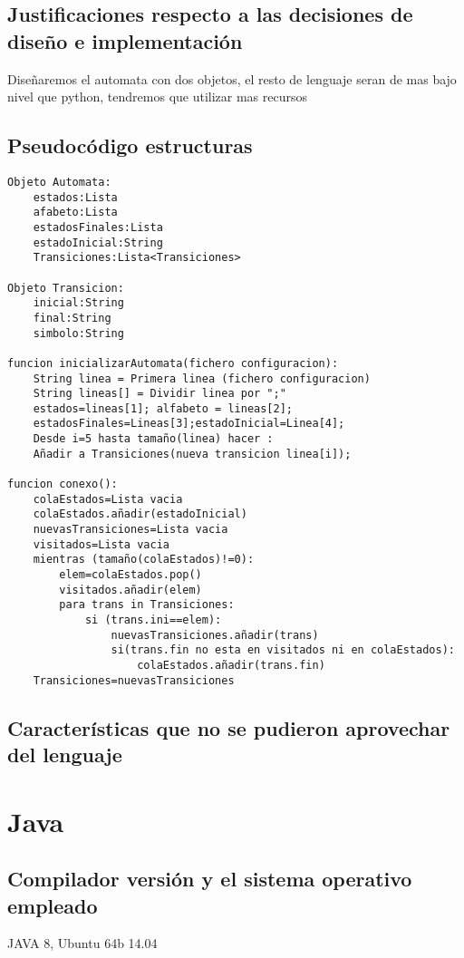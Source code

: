 \documentclass[12pt,a4paper]{article}
\begin{document}
\subsection{Justificaciones respecto a las decisiones de diseño e implementación}
Diseñaremos el automata con dos objetos, el resto de lenguaje seran de mas bajo 
nivel que python, tendremos que utilizar mas recursos

\subsection{Pseudocódigo estructuras}
\begin{lstlisting}
Objeto Automata:
	estados:Lista
	afabeto:Lista
	estadosFinales:Lista
	estadoInicial:String
	Transiciones:Lista<Transiciones>

Objeto Transicion: 
	inicial:String
	final:String
	simbolo:String

funcion inicializarAutomata(fichero configuracion):
	String linea = Primera linea (fichero configuracion)
	String lineas[] = Dividir linea por ";"
	estados=lineas[1]; alfabeto = lineas[2];
	estadosFinales=Lineas[3];estadoInicial=Linea[4];
	Desde i=5 hasta tamaño(linea) hacer :
	Añadir a Transiciones(nueva transicion linea[i]);

funcion conexo():
	colaEstados=Lista vacia
	colaEstados.añadir(estadoInicial)
	nuevasTransiciones=Lista vacia
	visitados=Lista vacia
	mientras (tamaño(colaEstados)!=0):
		elem=colaEstados.pop()
		visitados.añadir(elem)
		para trans in Transiciones:
			si (trans.ini==elem):
				nuevasTransiciones.añadir(trans)
				si(trans.fin no esta en	visitados ni en colaEstados):
					colaEstados.añadir(trans.fin)
	Transiciones=nuevasTransiciones
\end{lstlisting}

\subsection{Características que no se pudieron aprovechar del lenguaje}




\section{Java}
\subsection{Compilador versión y el sistema operativo empleado}
   JAVA 8, Ubuntu 64b 14.04
\end{document}
